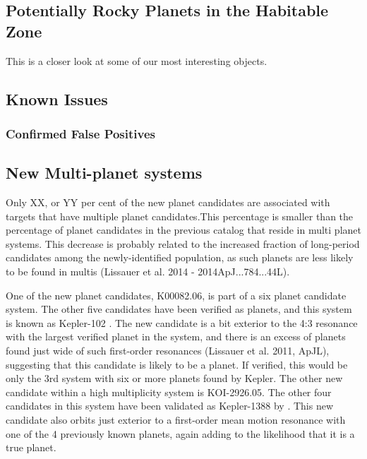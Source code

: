 

\subsection{Potentially Rocky Planets in the Habitable Zone}
This is a closer look at some of our most interesting objects.
\subsection{Known Issues}
\subsubsection{Confirmed False Positives}



\subsection{New Multi-planet systems}
Only XX, or YY per cent of the new planet candidates are associated with targets that have multiple planet candidates.This percentage is smaller than the percentage of planet candidates in the previous catalog that reside in multi planet systems.  This decrease is probably related to the increased fraction of long-period candidates among the newly-identified population, as such planets are less likely to be found in multis (Lissauer et al. 2014 - 2014ApJ...784...44L).

One of the new planet candidates, K00082.06, is part of a six planet candidate system.  The other five candidates have been verified as planets, and this system is known as Kepler-102 \citep{Marcy2014,Rowe2014}.  The new candidate is a bit exterior to the 4:3 resonance with the largest verified planet in the system, and there is an excess of planets found just wide of such first-order resonances (Lissauer et al. 2011, ApJL), suggesting that this candidate is likely to be a planet.  If verified, this would be only the 3rd system with six or more planets found by Kepler. 
The other new candidate within a high multiplicity system is KOI-2926.05.  The other four candidates in this system have been validated as Kepler-1388 by \citet{Morton2016}.  This new candidate also orbits just exterior to a first-order mean motion resonance with one of the 4 previously known planets, again adding to the likelihood that it is a true planet. 